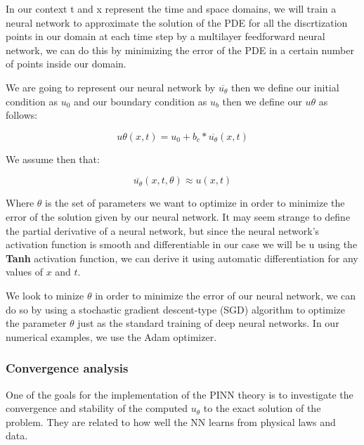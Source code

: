 \documentclass{article}
\begin{document}
In our context t and x represent the time and space domains, we will train a neural network to approximate the solution of the PDE for all the discrtization points in our domain 
at each time step  by a multilayer feedforward neural network, we can do this by minimizing the error of the PDE in a certain number of points inside our domain.

We are going to represent our neural network by $\overline{u_\theta}$ then we define our initial condition as $u_0$ and our boundary condition as $u_b$ then we define our $u\theta$ as follows:

$$
u\theta(x,t) = u_0 + b_c * \overline{u_\theta}(x,t)
$$

We assume then that:

$$\overline{u_\theta}(x,t,\theta)\approx u(x,t)$$ 

Where $\theta$ is the set of parameters we want to optimize in order to minimize the error of the solution given by our neural network.
It may seem strange to define the partial derivative of a neural network, but since the neural network's activation function is smooth and differentiable in our case we will be u
using the \textbf{Tanh} activation function, we can derive it using automatic differentiation for any values of $x$ and $t$.

We look to minize $\theta$ in order to minimize the error of our neural network, we can do so by using  a stochastic gradient descent-type (SGD) algorithm to optimize the parameter $\theta$ just 
as the standard training of deep neural networks. In our numerical examples, we use the Adam optimizer.


\subsubsection{Convergence analysis}
One of the goals for the implementation of the PINN theory is to investigate the convergence and stability of the computed $u_\theta$ to the exact solution of the problem. They are related to how well the NN learns from physical laws and data.

\end{document}

